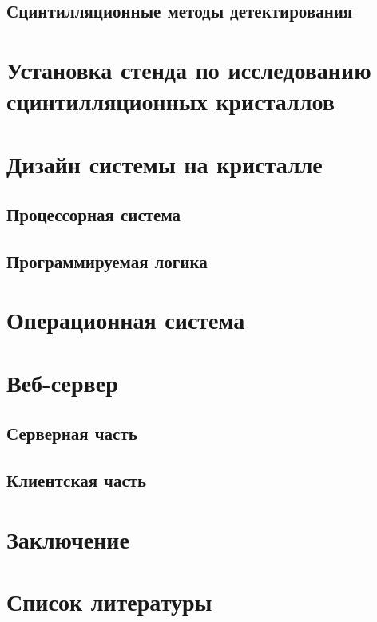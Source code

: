 \documentclass[a4paper, 12pt]{article}
\begin{document}
    \subsection{Сцинтилляционные методы детектирования}
    

\section{Установка стенда по исследованию сцинтилляционных кристаллов}

\section{Дизайн системы на кристалле}
    \subsection{Процессорная система}
    
    \subsection{Программируемая логика}
    

\section{Операционная система}

\section{Веб-сервер}
    \subsection{Серверная часть}
    
    \subsection{Клиентская часть}
    

\section{Заключение}

\section{Список литературы}
\end{document}
